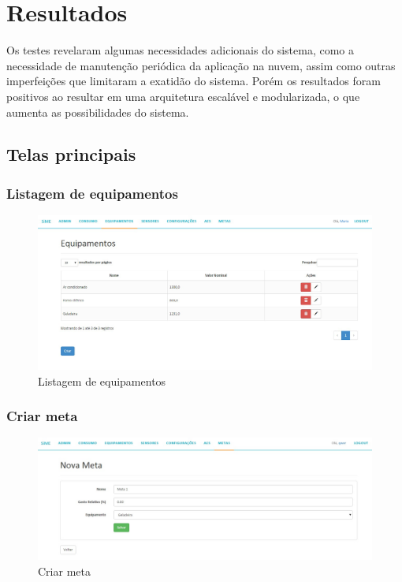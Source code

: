 \section{Resultados}
\label{Sec:6-resultados}

Os testes revelaram algumas necessidades adicionais do sistema, como a necessidade de manutenção periódica da aplicação na nuvem, assim como outras imperfeições que limitaram a exatidão do sistema. Porém os resultados foram positivos ao resultar em uma arquitetura escalável e modularizada, o que aumenta as possibilidades do sistema.

\subsection{Telas principais}

\subsubsection{Listagem de equipamentos}
\begin{figure}[H]
\centering
\includegraphics[width=1\textwidth]{figuras/equipamentos_list.jpg}
\caption{\label{fig:telas-equipamentos-list} Listagem de equipamentos}
\end{figure}

\subsubsection{Criar meta}
\begin{figure}[H]
\centering
\includegraphics[width=1\textwidth]{figuras/meta.jpg}
\caption{\label{fig:telas-metas-create} Criar meta}
\end{figure}

